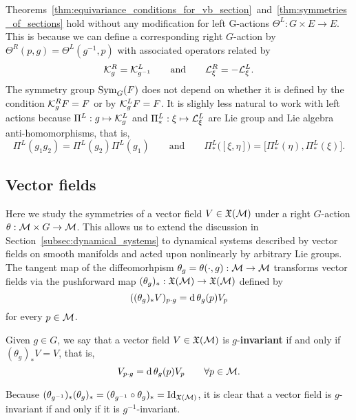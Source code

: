 \documentclass[twoside,11pt]{article}
\begin{document}
\begin{remark}
    Theorems~\ref{thm:equivariance_conditions_for_vb_section}~and~\ref{thm:symmetries_of_sections} hold without any modification for left G-actions $\Theta^L:G\times E \to E$.
    This is because we can define a corresponding right $G$-action by $\Theta^R(p,g) = \Theta^L(g^{-1},p)$ with associated operators related by 
    \begin{equation}
        {\mathcal{K}}^R_{g} = {\mathcal{K}}^L_{g^{-1}}
        \qquad \mbox{and}\qquad
        {\mathcal{L}}^R_{\xi} = - {\mathcal{L}}^L_{\xi}.
    \end{equation}
    The symmetry group $\operatorname{Sym}_G(F)$ does not depend on whether it is defined by the condition ${\mathcal{K}}^R_{g} F = F$ or by ${\mathcal{K}}^L_{g} F = F$.
    It is slighly less natural to work with left actions because $\Pi^L: g \mapsto {\mathcal{K}}^L_g$ and $\Pi^L_*: \xi \mapsto {\mathcal{L}}^L_\xi$ are Lie group and Lie algebra anti-homomorphisms, that is, 
    \begin{equation}
        \Pi^L(g_1 g_2) = \Pi^L(g_2) \Pi^L(g_1) 
        \qquad \mbox{and} \qquad
        \Pi^L_*\big([\xi,\eta]\big) 
        = \big[\Pi^L_*(\eta), \Pi^L_*(\xi)\big].
    \end{equation}
\end{remark}

\subsection{Vector fields}
\label{subsec:symmetry_of_vf}
    Here we study the symmetries of a vector field $V\in\mathfrak{X}({\mathcal{M}})$ under a right $G$-action $\theta:{\mathcal{M}}\times G \to{\mathcal{M}}$.
    This allows us to extend the discussion in Section~\ref{subsec:dynamical_systems} to dynamical systems described by vector fields on smooth manifolds and acted upon nonlinearly by arbitrary Lie groups.
    The tangent map of the diffeomorhpism $\theta_g = \theta(\cdot, g):{\mathcal{M}} \to {\mathcal{M}}$ transforms vector fields via the pushforward map $(\theta_{g})_* : \mathfrak{X}({\mathcal{M}}) \to \mathfrak{X}({\mathcal{M}})$ defined by
    \begin{equation}
        ((\theta_{g})_* V)_{p \cdot g} = \operatorname{\mathrm{d}} \theta_g(p) V_p
    \end{equation}
    for every $p\in{\mathcal{M}}$.
    \begin{definition}
        \label{def:invariance_of_vf}
        Given $g\in G$, we say that a vector field $V\in\mathfrak{X}({\mathcal{M}})$ is $g$-\textbf{invariant} if and only if $(\theta_g)_* V = V$, that is,
        \begin{equation}
            V_{p\cdot g} = \operatorname{\mathrm{d}} \theta_g(p) V_p \qquad \forall p\in{\mathcal{M}}.
        \end{equation}
    \end{definition}
    Because $(\theta_{g^{-1}})_* (\theta_g)_* = (\theta_{g^{-1}}\circ\theta_g)_* = \operatorname{Id}_{\mathfrak{X}({\mathcal{M}})}$, it is clear that a vector field is $g$-invariant if and only if it is $g^{-1}$-invariant.
    
\end{document}
